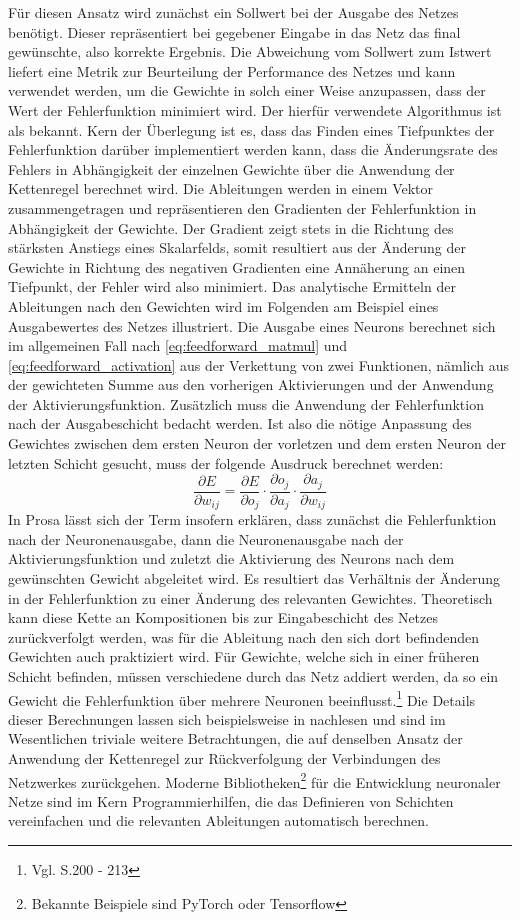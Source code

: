 Für diesen Ansatz wird zunächst ein Sollwert bei der Ausgabe des Netzes benötigt. Dieser repräsentiert bei gegebener Eingabe in das Netz das final gewünschte, also korrekte Ergebnis. Die Abweichung vom Sollwert zum Istwert liefert eine Metrik zur Beurteilung der Performance des Netzes und kann verwendet werden, um die Gewichte in solch einer Weise anzupassen, dass der Wert der Fehlerfunktion minimiert wird. Der hierfür verwendete Algorithmus ist als  bekannt. Kern der Überlegung ist es, dass das Finden eines Tiefpunktes der Fehlerfunktion darüber implementiert werden kann, dass die Änderungsrate des Fehlers in Abhängigkeit der einzelnen Gewichte über die Anwendung der Kettenregel berechnet wird. Die Ableitungen werden in einem Vektor zusammengetragen und repräsentieren den Gradienten der Fehlerfunktion in Abhängigkeit der Gewichte. Der Gradient zeigt stets in die Richtung des stärksten Anstiegs eines Skalarfelds, somit resultiert aus der Änderung der Gewichte in Richtung des negativen Gradienten eine Annäherung an einen Tiefpunkt, der Fehler wird also minimiert. Das analytische Ermitteln der Ableitungen nach den Gewichten wird im Folgenden am Beispiel eines Ausgabewertes des Netzes illustriert. Die Ausgabe eines Neurons berechnet sich im allgemeinen Fall nach \ref{eq:feedforward_matmul} und \ref{eq:feedforward_activation} aus der Verkettung von zwei Funktionen, nämlich aus der gewichteten Summe aus den vorherigen Aktivierungen und der Anwendung der Aktivierungsfunktion. Zusätzlich muss die Anwendung der Fehlerfunktion nach der Ausgabeschicht bedacht werden. Ist also die nötige Anpassung des Gewichtes zwischen dem ersten Neuron der vorletzen und dem ersten Neuron der letzten Schicht gesucht, muss der folgende Ausdruck berechnet werden:
\[\frac{\partial E}{\partial w_{ij}} = \frac{\partial E}{\partial o_j} \cdot \frac{\partial o_j}{\partial a_j}\cdot \frac{\partial a_j}{\partial w_{ij}}\]
In Prosa lässt sich der Term insofern erklären, dass zunächst die Fehlerfunktion nach der Neuronenausgabe, dann die Neuronenausgabe nach der Aktivierungsfunktion und zuletzt die Aktivierung des Neurons nach dem gewünschten Gewicht abgeleitet wird. Es resultiert das Verhältnis der Änderung in der Fehlerfunktion zu einer Änderung des relevanten Gewichtes. Theoretisch kann diese Kette an Kompositionen bis zur Eingabeschicht des Netzes zurückverfolgt werden, was für die Ableitung nach den sich dort befindenden Gewichten auch praktiziert wird. Für Gewichte, welche sich in einer früheren Schicht befinden, müssen verschiedene  durch das Netz addiert werden, da so ein Gewicht die Fehlerfunktion über mehrere Neuronen beeinflusst.\footnote{Vgl. \cite{goodfellow_deep_learning} S.200 - 213}
Die Details dieser Berechnungen lassen sich beispielsweise in \cite{goodfellow_deep_learning} nachlesen und sind im Wesentlichen triviale weitere Betrachtungen, die auf denselben Ansatz der Anwendung der Kettenregel zur Rückverfolgung der Verbindungen des Netzwerkes zurückgehen.
Moderne Bibliotheken\footnote{Bekannte Beispiele sind PyTorch oder Tensorflow} für die Entwicklung neuronaler Netze sind im Kern Programmierhilfen, die das Definieren von Schichten vereinfachen und die relevanten Ableitungen automatisch berechnen.

